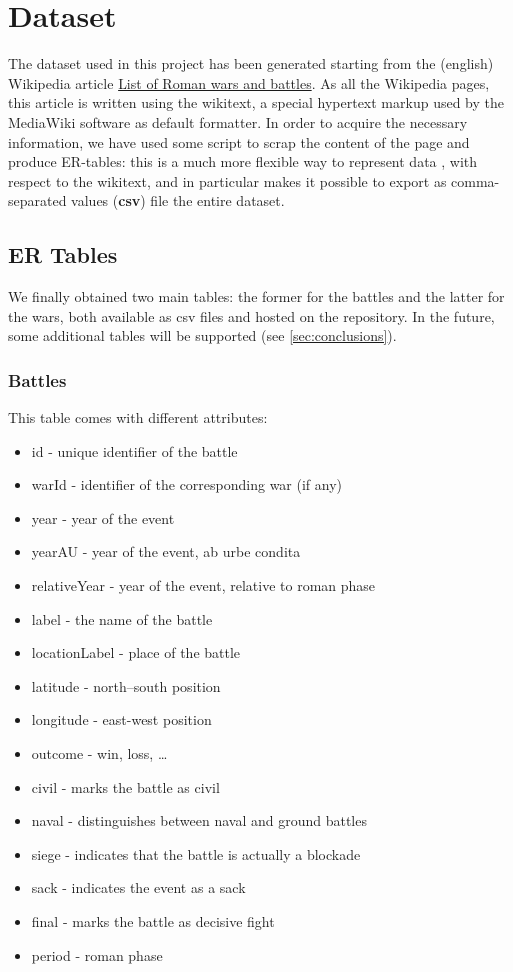 \section{Dataset}\label{sec:dataset}

The dataset used in this project has been generated starting from the (english) Wikipedia article \href{https://en.wikipedia.org/w/index.php?title=List_of_Roman_wars_and_battles}{List of Roman wars and battles}. As all the Wikipedia pages, this article is written using the wikitext, a special hypertext markup used by the MediaWiki software as default formatter. In order to acquire the necessary information, we have used some script to scrap the content of the page and produce ER-tables: this is a much more flexible way to represent data \cite{Chen76}, with respect to the wikitext, and in particular makes it possible to export as comma-separated values (\textbf{csv}) file the entire dataset.

\subsection{ER Tables}
We finally obtained two main tables: the former for the battles and the latter for the wars, both available as csv files and hosted on the repository. In the future, some additional tables will be supported (see \ref{sec:conclusions}).

\subsubsection{Battles}
This table comes with different attributes:
\begin{itemize}
    \item id - unique identifier of the battle
    \item warId - identifier of the corresponding war (if any)
    \item year - year of the event
    \item yearAU - year of the event, ab urbe condita
    \item relativeYear - year of the event, relative to roman phase
    \item label - the name of the battle
    \item locationLabel - place of the battle
    \item latitude - north–south position
    \item longitude - east-west position
    \item outcome - win, loss, \dots
    \item civil - marks the battle as civil
    \item naval - distinguishes between naval and ground battles
    \item siege - indicates that the battle is actually a blockade
    \item sack - indicates the event as a sack
    \item final - marks the battle as decisive fight
    \item period - roman phase
\end{itemize}

